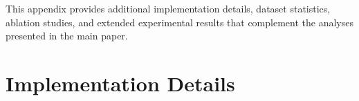 \appendix

\renewcommand{\topfraction}{0.9}
\renewcommand{\bottomfraction}{0.8}
\renewcommand{\textfraction}{0.07}
\renewcommand{\floatpagefraction}{0.8}
\setcounter{topnumber}{3}
\setcounter{totalnumber}{5}
\makeatletter
\setlength{\@fptop}{0pt}
\setlength{\@fpsep}{12pt plus 2pt}
\setlength{\@fpbot}{0pt plus 1fil}
\makeatother

 This appendix provides additional implementation details, dataset statistics, ablation studies, and extended experimental results that complement the analyses presented in the main paper.

\section{Implementation Details}
\label{app:implementation}

